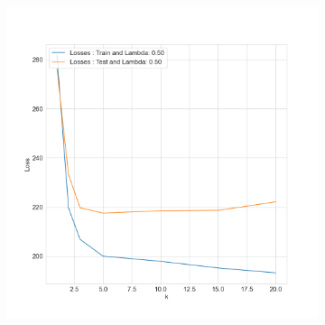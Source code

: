\documentclass{./tufte-handout}
\begin{document}
\begin{enumerate}[(a)]
\begin{figure}
\begin{subfigure}[b]{.5\textwidth}
        \includegraphics{../figures/normalized_least_squares_losses_for_k_lambda_0.50.png}
    \end{subfigure}



\end{figure}
\end{enumerate}
\end{document}
